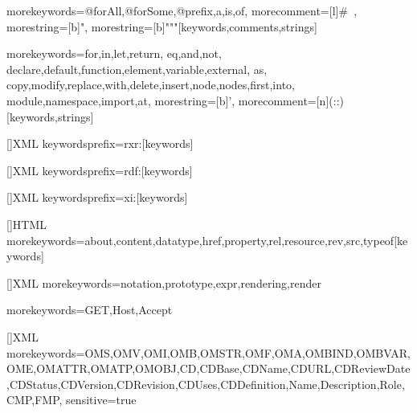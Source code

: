 %
{morekeywords={@forAll,@forSome,@prefix,a,is,of},%
morecomment=[l]{\#\ },%
morestring=[b]",%
morestring=[b]{"""}}[keywords,comments,strings]

%
{morekeywords={for,in,let,return,%
eq,and,not,%
declare,default,function,element,variable,external,%
as,%
copy,modify,replace,with,delete,insert,node,nodes,first,into,%
module,namespace,import,at},%
 morestring=[b]',%
 morecomment=[n]{(:}{:)}}[keywords,strings]

[]{XML}%
{keywordsprefix={rxr:}}[keywords]

[]{XML}%
{keywordsprefix={rdf:}}[keywords]

[]{XML}%
{keywordsprefix={xi:}}[keywords]

[]{HTML}%
{morekeywords={about,content,datatype,href,property,rel,resource,rev,src,typeof}}[keywords]

[]{XML}%
{morekeywords={notation,prototype,expr,rendering,render}}

%
{morekeywords={GET,Host,Accept}}

[]{XML}%
  {morekeywords={OMS,OMV,OMI,OMB,OMSTR,OMF,OMA,OMBIND,OMBVAR,OME,OMATTR,OMATP,OMOBJ,CD,CDBase,CDName,CDURL,CDReviewDate,CDStatus,CDVersion,CDRevision,CDUses,CDDefinition,Name,Description,Role,CMP,FMP},
  sensitive=true}


